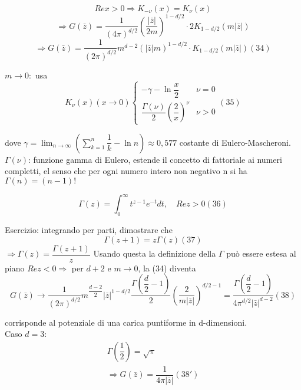 \documentclass[a4paper,11pt]{report}
\newcommand{\z}{\bar{z}}
\begin{document}
$$
Rex>0 \Rightarrow K_{-\nu}(x)=K_{\nu}(x)
$$
$$
\Rightarrow G(\bar{z})=\dfrac{1}{(4\pi)^{d/2}}\left(\dfrac{|\bar{z}|}{2m}\right)^{1-d/2}\cdot 2 K_{1-d/2}(m|\bar{z}|)
$$
\begin{equation}
\Rightarrow G(\z)=\dfrac{1}{(2\pi)^{d/2}}m^{d-2}(|\z|m)^{1-d/2}\cdot K_{1-d/2}(m|\z|) (34)
\end{equation}

$m\to 0:$ usa
\begin{equation}
K_{\nu}(x) (x\to 0)\left\{\begin{matrix}
-\gamma-\ln \dfrac{x}{2} & \nu=0 \\
\dfrac{\Gamma(\nu)}{2}\left(\dfrac{2}{x}\right)^{\nu} & \nu >0
\end{matrix}\right.(35)
\end{equation}

dove $\gamma=\lim_{n\to\infty}\left(\sum_{k=1}^{n}\dfrac{1}{k}-\ln n\right)\approx 0,577$ costante di Eulero-Mascheroni.\\
$\Gamma(\nu)$: funzione gamma di Eulero, estende il concetto di fattoriale ai numeri completti, el senso che per ogni numero intero non negativo n si ha $\Gamma (n)=(n-1)!$

\begin{equation}
\Gamma(z)=\int_0^{\infty}t^{z-1}e^{-t}dt,\quad Rez>0 (36)
\end{equation}

Esercizio: integrando per parti, dimostrare che 
\begin{equation}
\Gamma(z+1)=z\Gamma(z)(37)
\end{equation}
$\Rightarrow \Gamma(z)=\dfrac{\Gamma(z+1)}{z}$
Usando 	questa la definizione della $\Gamma$ può essere estesa al piano $Rez<0\Rightarrow$ per $d+2$ e $m\to 0$, la (34) diventa
\begin{equation}
G(\z)\rightarrow \dfrac{1}{(2\pi)^{d/2}}m^{\dfrac{d-2}{2}}|\z|^{1-d/2}\dfrac{\Gamma(\dfrac{d}{2}-1)}{2}\left(\dfrac{2}{m|\z|}\right)^{d/2-1}=\dfrac{\Gamma(\dfrac{d}{2}-1)}{4\pi^{d/2}|\z|^{d-2}} (38)
\end{equation}

corrisponde al potenziale di una carica puntiforme in d-dimensioni.\\
Caso $d=3$:
\begin{equation*}\label{2.38'}
\begin{matrix}
\Gamma\left(\dfrac{1}{2}\right)=\sqrt{\pi} \\
\Rightarrow G(\z)=\dfrac{1}{4\pi|\z|}(38')
\end{matrix}
\end{equation*}
\end{document}
